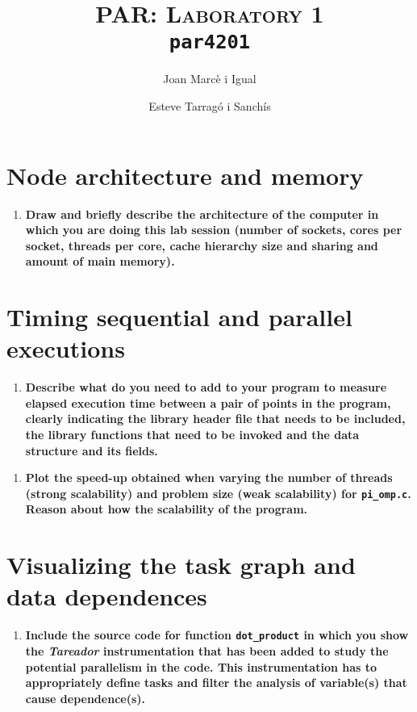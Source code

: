 \documentclass[a4paper]{article}
\title{
	\textsc{PAR: Laboratory 1} \\
	\texttt{\large par4201}
	}
\author{Joan Marcè i Igual \and Esteve Tarragó i Sanchís}
\begin{document}
\maketitle

\section*{Node architecture and memory}

\begin{enumerate}
	\item \textbf{Draw and briefly describe the architecture of the computer in which you are doing this lab session (number of sockets, cores per socket, threads per core, cache hierarchy size and sharing and amount of main memory).}
\end{enumerate}

\section*{Timing sequential and parallel executions}

\begin{enumerate}[resume]
	\item \textbf{Describe what do you need to add to your program to measure elapsed execution time between a pair of points in the program, clearly indicating the library header file that needs to be included, the library functions that need to be invoked and the data structure and its fields.}
\end{enumerate}

\begin{enumerate}[resume]
	\item \textbf{Plot the speed-up obtained when varying the number of threads (strong scalability) and problem size (weak scalability) for \texttt{pi\_omp.c}. Reason about how the scalability of the program.}
\end{enumerate}

\section*{Visualizing the task graph and data dependences}

\begin{enumerate}[resume]
	\item \textbf{Include the source code for function \texttt{dot\_product} in which you show the \textit{Tareador} instrumentation that has been added to study the potential parallelism in the code. This instrumentation has to appropriately define tasks and filter the analysis of variable(s) that cause dependence(s).}
\end{enumerate}
\end{document}
